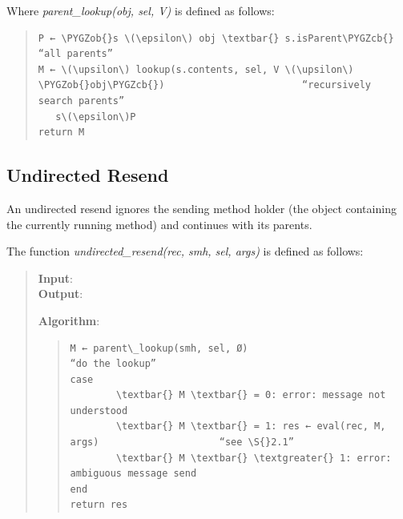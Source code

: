 \documentclass[letterpaper,10pt,english]{sphinxmanual}
\def\PYGZob{\char`\{}
\def\PYGZcb{\char`\}}
\begin{document}
Where \emph{parent\_lookup(obj, sel, V)} is defined as follows:
\begin{quote}

\begin{Verbatim}[commandchars=\\\{\}]
P ← \PYGZob{}s \(\epsilon\) obj \textbar{} s.isParent\PYGZcb{}                                      “all parents”
M ← \(\upsilon\) lookup(s.contents, sel, V \(\upsilon\) \PYGZob{}obj\PYGZcb{})                        “recursively search parents”
   s\(\epsilon\)P
return M
\end{Verbatim}
\end{quote}


\subsection{Undirected Resend}
\label{langref:undirected-resend}
An undirected resend ignores the sending method holder (the object containing the currently running method) and continues with its parents.

The function \emph{undirected\_resend(rec, smh, sel, args)} is defined as follows:
\begin{quote}
\begin{description}
\item[{\textbf{Input}:}] \leavevmode
{}

\item[{\textbf{Output}:}] \leavevmode
{}

\end{description}

\textbf{Algorithm}:
\begin{quote}

\begin{Verbatim}[commandchars=\\\{\}]
M ← parent\_lookup(smh, sel, Ø)                                  “do the lookup”
case
        \textbar{} M \textbar{} = 0: error: message not understood
        \textbar{} M \textbar{} = 1: res ← eval(rec, M, args)                     “see \S{}2.1”
        \textbar{} M \textbar{} \textgreater{} 1: error: ambiguous message send
end
return res
\end{Verbatim}
\end{quote}
\end{quote}
\end{document}
